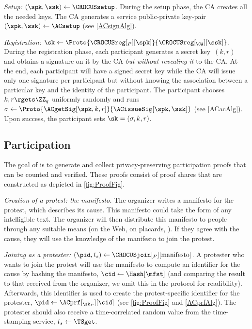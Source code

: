 \emph{Setup: \((\spk, \ssk)\gets \CROCUSsetup\).}
During the setup phase, the \ac{CA} creates all the needed keys.
The \ac{CA} generates a service public-private key-pair \((\spk, \ssk)\gets 
  \ACsetup\) (see \cref{ACsignAlg}).

\emph{Registration: \(\sk\gets 
    \Proto{\CROCUSreg[_P][\spk]}{\CROCUSreg[_{\CA}][\ssk]}\).}
During the registration phase, each participant generates a secret key~\((k, 
  r)\) and obtains a signature on it by the \ac{CA} \emph{but without revealing 
  it} to the \ac{CA}.
At the end, each participant will have a signed secret key while the \ac{CA} 
will issue only one signature per participant but without knowing the 
association between a particular key and the identity of the participant.
The participant chooses \(k, r\rgets \ZZ_q\) uniformly randomly and runs 
\(\sigma \gets \Proto{\ACgetSig[\spk, k, r]}{\ACissueSig[\spk, \ssk]}\) (see 
\cref{ACacAlg}).
Upon success, the participant sets \(\sk = (\sigma, k, r)\).



\subsection{Participation}%
\label{ProtocolDuring}

The goal of \CROCUS is to generate and collect privacy-preserving
participation proofs that can be counted and verified. These proofs
consist of proof shares that are constructed as depicted in
\cref{fig:ProofFig}. 

\emph{Creation of a protest: the manifesto.}
The organizer writes a manifesto for the protest, which describes its cause.
This manifesto could take the form of any intelligible text.
The organizer will then distribute this manifesto to people through
any suitable means  (\eg on the Web, on placards, \etc).
If they agree with the cause, they will use the knowledge of the
manifesto to join the protest. 


\emph{Joining as a protester: \((\pid, t_s)\gets 
    \CROCUSjoin[_P][\text{manifesto}]\).}
A protester who wants to join the protest will use the manifesto to
compute an identifier for the cause by hashing the manifesto,
\(\cid\gets \Hash[\mfst]\) (and comparing the result to that received
from the organizer, we omit this in the protocol for readibility).
Afterwards, this identifier is used to create the protest-specific identifier 
for the protester, \(\pid\gets \ACprf[_{\sk_P}][\cid]\) (see 
\cref{fig:ProofFig} and \cref{ACprfAlg}).
The protester should also receive a time-correlated random value from the 
time-stamping service, \(t_s\gets \TSget\).


